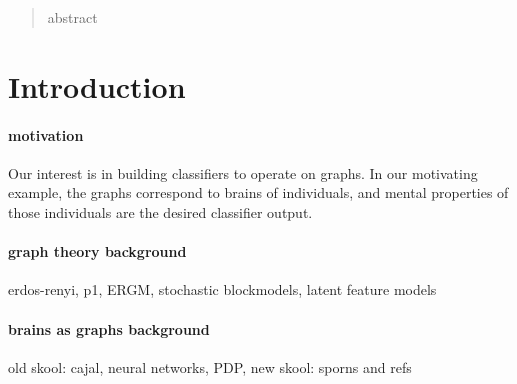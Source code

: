 \documentclass{article}
\begin{document}
 


\begin{abstract} 
abstract
\end{abstract} 

\section{Introduction} %
\label{sec:introduction}


\paragraph{motivation}

Our interest is in building classifiers to operate on graphs.  In our motivating example, the graphs correspond to brains of individuals, and mental properties of those individuals are the desired classifier output.  


\paragraph{graph theory background}

erdos-renyi, p1, ERGM, stochastic blockmodels, latent feature models

\paragraph{brains as graphs background}

old skool: cajal, neural networks, PDP, 
new skool: sporns and refs
\end{document}

